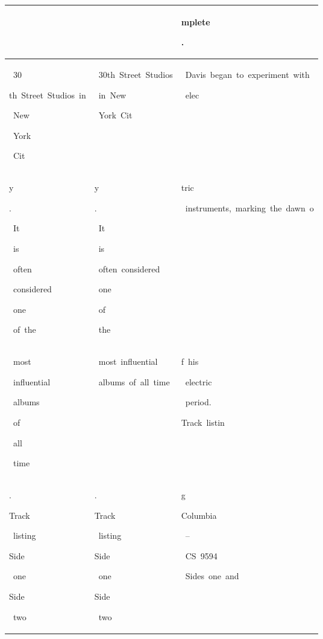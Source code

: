 \begin{table}[h]
\begin{tabular}{ l | l | l }
  &  & \colorbox{cm_0!40}{\strut mplete}\colorbox{cm_12!40}{\strut .} \\ 
  \hline \colorbox{cm_37!40}{\strut \ 30}\colorbox{cm_32!40}{\strut th\ Street\ Studios\ in}\colorbox{cm_29!40}{\strut \ New}\colorbox{cm_32!40}{\strut \ York}\colorbox{cm_34!40}{\strut \ Cit} & \colorbox{cm_0!40}{\strut \ 30th\ Street\ Studios}\colorbox{cm_12!40}{\strut \ in\ New}\colorbox{cm_0!40}{\strut \ York\ Cit} & \colorbox{cm_0!40}{\strut \ Davis\ began\ to\ experiment\ with}\colorbox{cm_12!40}{\strut \ elec} \\ 
 \colorbox{cm_34!40}{\strut y}\colorbox{cm_36!40}{\strut .}\colorbox{cm_31!40}{\strut \ It}\colorbox{cm_35!40}{\strut \ is}\colorbox{cm_30!40}{\strut \ often}\colorbox{cm_29!40}{\strut \ considered}\colorbox{cm_36!40}{\strut \ one}\colorbox{cm_32!40}{\strut \ of\ the} & \colorbox{cm_0!40}{\strut y}\colorbox{cm_12!40}{\strut .}\colorbox{cm_25!40}{\strut \ It}\colorbox{cm_12!40}{\strut \ is}\colorbox{cm_0!40}{\strut \ often\ considered}\colorbox{cm_12!40}{\strut \ one}\colorbox{cm_25!40}{\strut \ of}\colorbox{cm_38!40}{\strut \ the} & \colorbox{cm_12!40}{\strut tric}\colorbox{cm_0!40}{\strut \ instruments,\ marking\ the\ dawn\ o} \\ 
 \colorbox{cm_37!40}{\strut \ most}\colorbox{cm_29!40}{\strut \ influential}\colorbox{cm_27!40}{\strut \ albums}\colorbox{cm_31!40}{\strut \ of}\colorbox{cm_27!40}{\strut \ all}\colorbox{cm_32!40}{\strut \ time} & \colorbox{cm_0!40}{\strut \ most\ influential}\colorbox{cm_12!40}{\strut \ albums\ of\ all\ time} & \colorbox{cm_0!40}{\strut f\ his}\colorbox{cm_12!40}{\strut \ electric}\colorbox{cm_0!40}{\strut \ period.}\colorbox{cm_12!40}{\strut }\colorbox{cm_25!40}{\strut }\colorbox{cm_0!40}{\strut Track\ listin} \\ 
 \colorbox{cm_31!40}{\strut .}\colorbox{cm_33!40}{\strut }\colorbox{cm_32!40}{\strut }\colorbox{cm_33!40}{\strut Track}\colorbox{cm_34!40}{\strut \ listing}\colorbox{cm_28!40}{\strut }\colorbox{cm_29!40}{\strut }\colorbox{cm_35!40}{\strut Side}\colorbox{cm_33!40}{\strut \ one}\colorbox{cm_31!40}{\strut }\colorbox{cm_30!40}{\strut }\colorbox{cm_29!40}{\strut Side}\colorbox{cm_32!40}{\strut \ two} & \colorbox{cm_12!40}{\strut .}\colorbox{cm_25!40}{\strut }\colorbox{cm_38!40}{\strut Track}\colorbox{cm_51!40}{\strut \ listing}\colorbox{cm_63!40}{\strut }\colorbox{cm_25!40}{\strut }\colorbox{cm_0!40}{\strut Side}\colorbox{cm_12!40}{\strut \ one}\colorbox{cm_25!40}{\strut }\colorbox{cm_0!40}{\strut Side}\colorbox{cm_12!40}{\strut \ two} & \colorbox{cm_0!40}{\strut g}\colorbox{cm_12!40}{\strut }\colorbox{cm_0!40}{\strut Columbia}\colorbox{cm_12!40}{\strut \ –}\colorbox{cm_0!40}{\strut \ CS\ 9594}\colorbox{cm_12!40}{\strut }\colorbox{cm_25!40}{\strut }\colorbox{cm_0!40}{\strut \ Sides\ one\ and} \\ 

\end{tabular}
\end{table}
